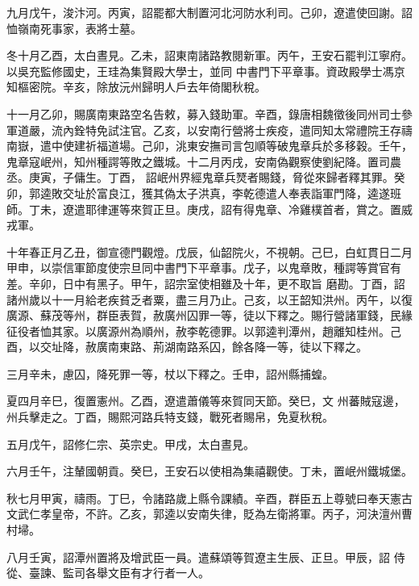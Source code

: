 \begin{pinyinscope}
 九月戊午，浚汴河。丙寅，詔罷都大制置河北河防水利司。己卯，遼遣使回謝。詔恤嶺南死事家，表將士墓。



 冬十月乙酉，太白晝見。乙未，詔東南諸路教閱新軍。丙午，王安石罷判江寧府。以吳充監修國史，王珪為集賢殿大學士，並同
 中書門下平章事。資政殿學士馮京知樞密院。辛亥，除放沅州歸明人戶去年倚閣秋稅。



 十一月乙卯，賜廣南東路空名告敕，募入錢助軍。辛酉，錄唐相魏徵後同州司士參軍道嚴，流內銓特免試注官。乙亥，以安南行營將士疾疫，遣同知太常禮院王存禱南嶽，遣中使建祈福道場。己卯，洮東安撫司言包順等破鬼章兵於多移穀。壬午，鬼章寇岷州，知州種諤等敗之鐵城。十二月丙戌，安南偽觀察使劉紀降。置司農丞。庚寅，子傭生。丁酉，
 詔岷州界經鬼章兵燹者賜錢，脅從來歸者釋其罪。癸卯，郭逵敗交址於富良江，獲其偽太子洪真，李乾德遣人奉表詣軍門降，逵遂班師。丁未，遼遣耶律運等來賀正旦。庚戌，詔有得鬼章、冷雞樸首者，賞之。置威戎軍。



 十年春正月乙丑，御宣德門觀燈。戊辰，仙韶院火，不視朝。己巳，白虹貫日二月甲申，以崇信軍節度使宗旦同中書門下平章事。戊子，以鬼章敗，種諤等賞官有差。辛卯，日中有黑子。甲午，詔宗室使相雖及十年，更不取旨
 磨勘。丁酉，詔諸州歲以十一月給老疾貧乏者粟，盡三月乃止。己亥，以王韶知洪州。丙午，以復廣源、蘇茂等州，群臣表賀，赦廣州囚罪一等，徒以下釋之。賜行營諸軍錢，民緣征役者恤其家。以廣源州為順州，赦李乾德罪。以郭逵判潭州，趙離知桂州。己酉，以交址降，赦廣南東路、荊湖南路系囚，餘各降一等，徒以下釋之。



 三月辛未，慮囚，降死罪一等，杖以下釋之。壬申，詔州縣捕蝗。



 夏四月辛巳，復置憲州。乙酉，遼遣蕭儀等來賀同天節。癸巳，文
 州蕃賊寇邊，州兵擊走之。丁酉，賜熙河路兵特支錢，戰死者賜帛，免夏秋稅。



 五月戊午，詔修仁宗、英宗史。甲戌，太白晝見。



 六月壬午，注輦國朝貢。癸巳，王安石以使相為集禧觀使。丁未，置岷州鐵城堡。



 秋七月甲寅，禱雨。丁巳，令諸路歲上縣令課績。辛酉，群臣五上尊號曰奉天憲古文武仁孝皇帝，不許。乙亥，郭逵以安南失律，貶為左衛將軍。丙子，河決澶州曹村埽。



 八月壬寅，詔潭州置將及增武臣一員。遣蘇頌等賀遼主生辰、正旦。甲辰，詔
 侍從、臺諫、監司各舉文臣有才行者一人。




\end{pinyinscope}
